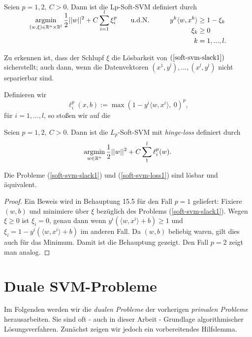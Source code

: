 \begin{definition}
	Seien $p=1,2,\ C > 0$. Dann ist die Lp-Soft-SVM definiert durch
	\begin{equation}
	\label{soft-svm-slack1}
	\begin{aligned}
		& \smash{ \operatorname*{argmin}_{(w,\xi) \in \mathbb{R}^n \times \mathbb{R}^l}{
			\frac{1}{2}||w||^2+C\sum_{i=1}^{l}{\xi_i^p}
		}}
		\qquad \text{u.d.N.} \qquad
		& y^k \langle w, x^k \rangle &\geq 1 - \xi_k \\
		&& \xi_k &\geq 0 \\
		&& k &= 1,...,l.
	\end{aligned}
	\end{equation}
\end{definition}
Zu erkennen ist, dass der Schlupf $\xi$ die Lösbarkeit von $(\ref{soft-svm-slack1})$ sicherstellt; auch dann, wenn die Datenvektoren $(x^1,y^l),...,(x^l,y^l)$ nicht separierbar sind.

Definieren wir $$\ell_i^p(x,b) := \max(1-y^i\langle w, x^i \rangle,\ 0)^p,$$ für $i=1,...,l$, so stoßen wir auf die
\begin{definition}
	Seien $p=1,2,\ C > 0$. Dann ist die $L_p$-Soft-SVM mit \emph{hinge-loss} definiert durch
	\begin{equation}
	\label{soft-svm-loss1}
	\begin{aligned}
	\operatorname*{argmin}_{w \in \mathbb{R}^n}{\frac{1}{2}||w||^2+C\sum_{1}^{l}{\ell_i^p(w)}}.
	\end{aligned}
	\end{equation}
\end{definition}

\begin{lemma}
	\label{lemma-soft-loesbar}
	Die Probleme (\ref{soft-svm-slack1}) und (\ref{soft-svm-loss1}) sind lösbar und äquivalent. 
\end{lemma}
\begin{proof}
	Ein Beweis wird in Behauptung 15.5 \cite{sb-umlfta} für den Fall $p=1$ geliefert: Fixiere $(w,b)$ und minimiere über $\xi$ bezüglich des Problems (\ref{soft-svm-slack1}). Wegen $\xi \geq 0$ ist $\xi_i = 0$, genau dann wenn $y^i(\langle w, x^i \rangle +b) \geq 1$ und $\xi_i = 1-y^i(\langle w, x^i \rangle +b)$ im anderen Fall. Da $(w,b)$ beliebig waren, gilt dies auch für das Minimum. Damit ist die Behauptung gezeigt. Den Fall $p=2$ zeigt man analog.
\end{proof}

\section{Duale SVM-Probleme}
Im Folgenden werden wir die \emph{dualen Probleme} der vorherigen \emph{primalen Probleme} herausarbeiten. Sie sind oft - auch in dieser Arbeit - Grundlage algorithmischer Lösungsverfahren. Zunächst zeigen wir jedoch ein vorbereitendes Hilfslemma.

